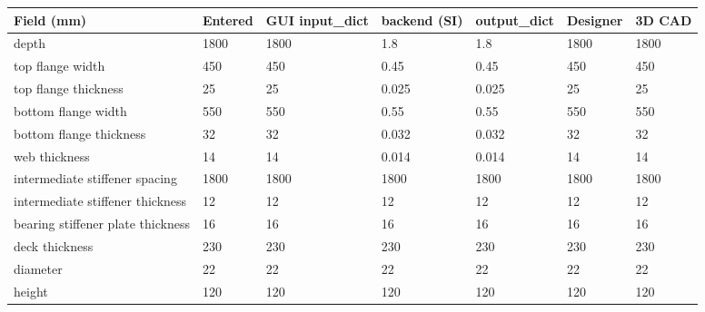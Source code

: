 \begin{tabular}{@{}lllllll@{}}
\toprule
\textbf{Field (mm)} & \textbf{Entered} & \textbf{GUI input\_dict} & \textbf{backend (SI)} & \textbf{output\_dict} & \textbf{Designer} & \textbf{3D CAD} \\
\midrule
depth & 1800 & 1800 & 1.8 & 1.8 & 1800 & 1800 \\
top flange width & 450 & 450 & 0.45 & 0.45 & 450 & 450 \\
top flange thickness & 25 & 25 & 0.025 & 0.025 & 25 & 25 \\
bottom flange width & 550 & 550 & 0.55 & 0.55 & 550 & 550 \\
bottom flange thickness & 32 & 32 & 0.032 & 0.032 & 32 & 32 \\
web thickness & 14 & 14 & 0.014 & 0.014 & 14 & 14 \\
intermediate stiffener spacing & 1800 & 1800 & 1800 & 1800 & 1800 & 1800 \\
intermediate stiffener thickness & 12 & 12 & 12 & 12 & 12 & 12 \\
bearing stiffener plate thickness & 16 & 16 & 16 & 16 & 16 & 16 \\
deck thickness & 230 & 230 & 230 & 230 & 230 & 230 \\
diameter & 22 & 22 & 22 & 22 & 22 & 22 \\
height & 120 & 120 & 120 & 120 & 120 & 120 \\
\bottomrule
\end{tabular}
